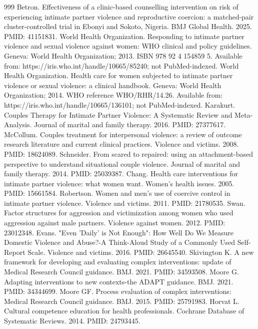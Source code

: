 \begin{thebibliography}{999}
 Betron. Effectiveness of a clinic-based counselling intervention on risk of experiencing intimate partner violence and reproductive coercion: a matched-pair cluster-controlled trial in Ebonyi and Sokoto, Nigeria. BMJ Global Health. 2025. PMID: 41151831.
 World Health Organization. Responding to intimate partner violence and sexual violence against women: WHO clinical and policy guidelines. Geneva: World Health Organization; 2013. ISBN 978 92 4 154859 5. Available from: https://iris.who.int/handle/10665/85240; not PubMed-indexed.
 World Health Organization. Health care for women subjected to intimate partner violence or sexual violence: a clinical handbook. Geneva: World Health Organization; 2014. WHO reference WHO/RHR/14.26. Available from: https://iris.who.int/handle/10665/136101; not PubMed-indexed.
 Karakurt. Couples Therapy for Intimate Partner Violence: A Systematic Review and Meta-Analysis. Journal of marital and family therapy. 2016. PMID: 27377617.
 McCollum. Couples treatment for interpersonal violence: a review of outcome research literature and current clinical practices. Violence and victims. 2008. PMID: 18624089.
 Schneider. From scared to repaired: using an attachment-based perspective to understand situational couple violence. Journal of marital and family therapy. 2014. PMID: 25039387.
 Chang. Health care interventions for intimate partner violence: what women want. Women's health issues. 2005. PMID: 15661584.
 Robertson. Women and men's use of coercive control in intimate partner violence. Violence and victims. 2011. PMID: 21780535.
 Swan. Factor structures for aggression and victimization among women who used aggression against male partners. Violence against women. 2012. PMID: 23012348.
 Evans. "Even 'Daily' is Not Enough": How Well Do We Measure Domestic Violence and Abuse?-A Think-Aloud Study of a Commonly Used Self-Report Scale. Violence and victims. 2016. PMID: 26645540.
 Skivington K. A new framework for developing and evaluating complex interventions: update of Medical Research Council guidance. BMJ. 2021. PMID: 34593508.
 Moore G. Adapting interventions to new contexts-the ADAPT guidance. BMJ. 2021. PMID: 34344699.
 Moore GF. Process evaluation of complex interventions: Medical Research Council guidance. BMJ. 2015. PMID: 25791983.
 Horvat L. Cultural competence education for health professionals. Cochrane Database of Systematic Reviews. 2014. PMID: 24793445.

\end{thebibliography}
